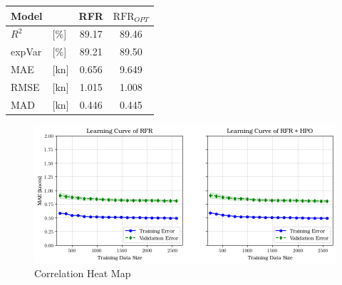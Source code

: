 \documentclass[]{interact}
\theoremstyle{plain}%
\theoremstyle{definition}
\theoremstyle{remark}
\begin{document}
\begin{table}
    {\begin{tabular}{l l c c}
    \hline
    Model   &       & RFR   	& $\text{RFR}_{OPT}$  \\
    \hline
    $R^2$   & [\%]  & 89.17   & 89.46               \\
    expVar  & [\%]  & 89.21   & 89.50               \\
    MAE     & [kn]  & 0.656   & 9.649               \\
    RMSE    & [kn]  & 1.015   & 1.008               \\
    MAD     & [kn]  & 0.446   & 0.445               \\  
    \hline
    \end{tabular}}
  \label{tbl:cv_rfr_j}
  \end{table}

\begin{figure}
    \centering
    \includegraphics[width=.8\linewidth]{00_figures/learning_curve_rfr_mae.png}
    \caption{Correlation Heat Map}
    \label{fig:learn_curve_RFR_MAE}
\end{figure}








\end{document}
